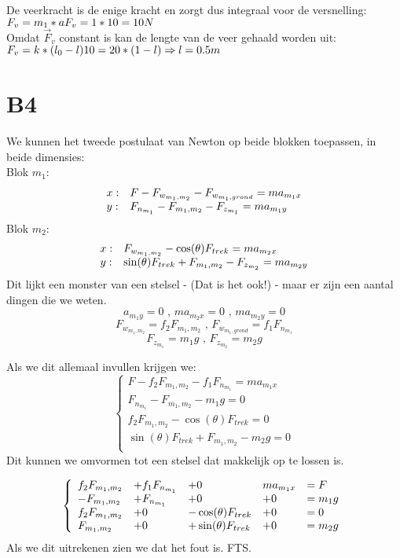 \documentclass[10pt,a4paper]{article}
\begin{document}
\noindent De veerkracht is de enige kracht en zorgt dus integraal voor de versnelling:\\
$F_v = m_1*a\\
F_v = 1*10 = 10 N$\\

\noindent Omdat $\vec{F}_v$ constant is kan de lengte van de veer gehaald worden uit:\\
$F_v = k * (l_0 - l)\\
10 = 20 *(1 -l)\\
\Rightarrow l =0.5m$
\section*{B4}
We kunnen het tweede postulaat van Newton op beide blokken toepassen, in beide dimensies:\\
Blok $m_1$:
\[
\begin{array}{l l}
x: & F - F_{w_{m_1,m_2}} - F_{w_{m_1,grond}} = m a_{m_1x}\\
y: & F_{n_{m_1}} -F_{m_1,m_2} - F_{z_{m_1}} = m a_{m_1y}\\
\end{array}
\]
Blok $m_2$:
\[
\begin{array}{l l}
x: & F_{w_{m_1,m_2}} - \cos(\theta)F_{trek} = m a_{m_2x}\\
y: & \sin(\theta)F_{trek} + F_{m_1,m_2} - F_{z_{m_2}} = m a_{m_2y}\\
\end{array}
\]
Dit lijkt een monster van een stelsel - (Dat is het ook!) - maar er zijn een aantal dingen die we weten.
\[
a_{m_1y} = 0 \text{ ,  } m a_{m_2x}=0 \text{ ,  }  m a_{m_2y}=0
\]
\[
F_{w_{m_1,m_2}} = f_2 F_{m_1,m_2} \text{ ,  }F_{w_{m_1,grond}} = f_1 F_{n_{m_1}}
\]
\[
F_{z_{m_1}} = m_1 g \text{ ,  } F_{z_{m_2}} = m_2 g
\]

Als we dit allemaal invullen krijgen we:
\[
\left\lbrace
\begin{array}{l}
F - f_2 F_{m_1,m_2} - f_1 F_{n_{m_1}} = m a_{m_1x}\\
F_{n_{m_1}} - F_{m_1,m_2} -  m_1 g  = 0\\
f_2 F_{m_1,m_2} - \cos(\theta)F_{trek} = 0\\
\sin(\theta)F_{trek} + F_{m_1,m_2} - m_2 g = 0\\
\end{array}
\right.
\]
Dit kunnen we omvormen tot een stelsel dat makkelijk op te lossen is.

\[
\left\lbrace
\begin{array}{l l l l l}
f_2 F_{m_1,m_2} &+ f_1 F_{n_{m_1}} &+ 0 & m a_{m_1x} &=F\\
- F_{m_1,m_2} &+ F_{n_{m_1}}  &+ 0 &+ 0 &= m_1 g\\
f_2 F_{m_1,m_2} &+ 0 &- \cos(\theta)F_{trek} &+ 0 &= 0\\
F_{m_1,m_2} &+ 0 &+\sin(\theta)F_{trek} &+ 0 &= m_2 g\\
\end{array}
\right.
\]
Als we dit uitrekenen zien we dat het fout is. FTS.
\end{document}
